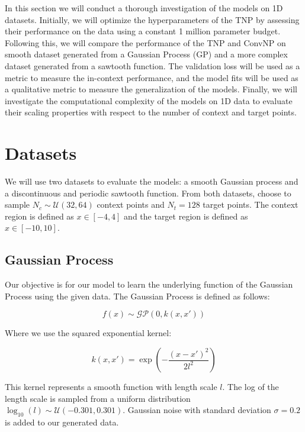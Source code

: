 \documentclass[../../main.tex]{subfiles}
\begin{document}
In this section we will conduct a thorough investigation of the models on 1D datasets. Initially, we will optimize the hyperparameters of the TNP by assessing their performance on the data using a constant 1 million parameter budget. Following this, we will compare the performance of the TNP and ConvNP on smooth dataset generated from a Gaussian Process (GP) \cite{books/lib/RasmussenW06} and a more complex dataset generated from a sawtooth function. The validation loss will be used as a metric to measure the in-context performance, and the model fits will be used as a qualitative metric to measure the generalization of the models. Finally, we will investigate the computational complexity of the models on 1D data to evaluate their scaling properties with respect to the number of context and target points.

\section{Datasets}

We will use two datasets to evaluate the models: a smooth Gaussian process and a discontinuous and periodic sawtooth function. From both datasets, choose to sample $N_c \sim \mathcal{U}(32, 64)$ context points and $N_t = 128$ target points. The context region is defined as $x \in [-4, 4]$ and the target region is defined as $x \in [-10, 10]$. 

\subsection{Gaussian Process}
\label{sec:1d-gp-dataset}

 Our objective is for our model to learn the underlying function of the Gaussian Process using the given data. The Gaussian Process is defined as follows:

\begin{equation}
	f(x) \sim \mathcal{GP}(0, k(x, x'))
\end{equation}

Where we use the squared exponential kernel:

\begin{equation}
	k(x, x') = \exp\left(-\frac{(x - x')^2}{2l^2}\right)
\end{equation}

This kernel represents a smooth function with length scale $l$. The log of the length scale is sampled from a uniform distribution $\log_{10}(l) \sim \mathcal{U}(-0.301, 0.301)$. Gaussian noise with standard deviation $\sigma = 0.2$ is added to our generated data. 
\end{document}
